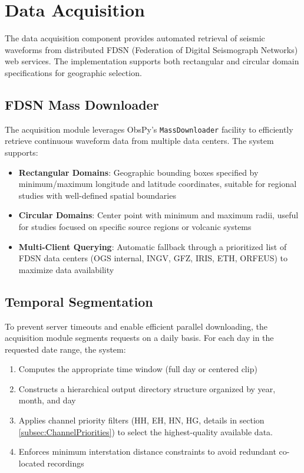 \section{Data Acquisition}

The data acquisition component provides automated retrieval of seismic
waveforms from distributed FDSN (Federation of Digital Seismograph Networks)
web services. The implementation supports both rectangular and circular domain
specifications for geographic selection.

\subsection{FDSN Mass Downloader}
The acquisition module leverages ObsPy's \texttt{MassDownloader} facility to
efficiently retrieve continuous waveform data from multiple data centers. The
system supports:

\begin{itemize}
  \item \textbf{Rectangular Domains}: Geographic bounding boxes specified by
    minimum/maximum longitude and latitude coordinates, suitable for regional
    studies with well-defined spatial boundaries

  \item \textbf{Circular Domains}: Center point with minimum and maximum radii,
    useful for studies focused on specific source regions or volcanic systems

  \item \textbf{Multi-Client Querying}: Automatic fallback through a
    prioritized list of FDSN data centers (OGS internal, INGV, GFZ, IRIS, ETH,
    ORFEUS) to maximize data availability
\end{itemize}

\subsection{Temporal Segmentation}
To prevent server timeouts and enable efficient parallel downloading, the
acquisition module segments requests on a daily basis. For each day in the
requested date range, the system:

\begin{enumerate}
  \item Computes the appropriate time window (full day or centered clip)
  \item Constructs a hierarchical output directory structure organized by
    year, month, and day
  \item Applies channel priority filters (HH, EH, HN, HG, details in section
    \ref{subsec:ChannelPriorities}) to select the highest-quality
    available data.
  \item Enforces minimum interstation distance constraints to avoid
    redundant co-located recordings
\end{enumerate}

